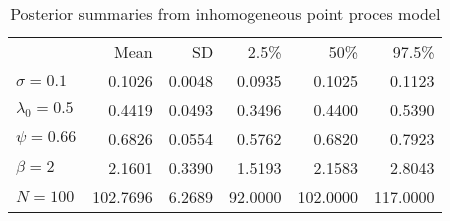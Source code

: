 
\begin{table}
\centering
\caption{Posterior summaries from inhomogeneous point proces model}
\begin{tabular}{lrrrrr}
\hline
& Mean & SD & 2.5\% & 50\% & 97.5\% \\
 $\sigma=0.1$ &   0.1026 &   0.0048 &   0.0935 &   0.1025 &   0.1123 \\
 $\lambda_0=0.5$ &   0.4419 &   0.0493 &   0.3496 &   0.4400 &   0.5390 \\
 $\psi=0.66$ &   0.6826 &   0.0554 &   0.5762 &   0.6820 &   0.7923 \\
 $\beta=2$ &   2.1601 &   0.3390 &   1.5193 &   2.1583 &   2.8043 \\
 $N=100$ & 102.7696 &   6.2689 &  92.0000 & 102.0000 & 117.0000 \\
 
\hline
\end{tabular}
\label{ch9:tab:simIPP}
\end{table}
